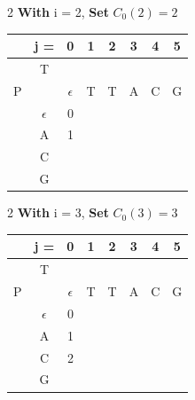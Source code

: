 \begin{multicols}{2}
    \textbf{With} i = 2, \textbf{Set} $C_0(2) = 2$

    \begin{center}
        \begin{tabular}{|c c|c|c|c|c|c|c|} \hline
        &   j =  &  0           &   1   &   2   &   3   &   4   &   5   \\ \hline
        &   T    &              &       &       &       &       &       \\
        P   &        &  $\epsilon$  &   T   &   T   &   A   &   C   &   G   \\ \hline
        & $\epsilon$ &       0      &       &       &       &       &       \\ \hline
        &    A   &     1        &       &       &       &       &       \\ \hline
        &    C   & \ccr2        &       &       &       &       &       \\ \hline
        &    G   &              &       &       &       &       &       \\ \hline
        \end{tabular}
    \end{center}
\end{multicols}

\begin{multicols}{2}
    \textbf{With} i = 3, \textbf{Set} $C_0(3) = 3$

    \begin{center}
        \begin{tabular}{|c c|c|c|c|c|c|c|} \hline
        &   j =  &  0           &   1   &   2   &   3   &   4   &   5   \\ \hline
        &   T    &              &       &       &       &       &       \\
        P   &        &  $\epsilon$  &   T   &   T   &   A   &   C   &   G   \\ \hline
        & $\epsilon$ &       0      &       &       &       &       &       \\ \hline
        &    A   &     1        &       &       &       &       &       \\ \hline
        &    C   & 2            &       &       &       &       &       \\ \hline
        &    G   & \ccr3        &       &       &       &       &       \\ \hline
        \end{tabular}
    \end{center}
\end{multicols}

